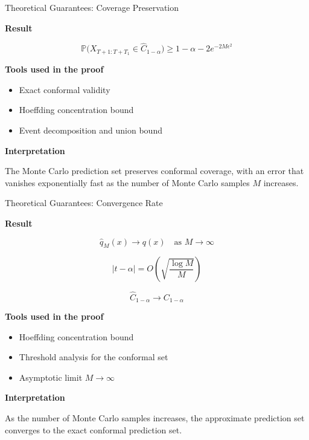 \documentclass{beamer}					%
\begin{document}
\begin{frame}{Theoretical Guarantees: Coverage Preservation}

\textbf{Result}

\[
\mathbb{P}\big(X_{T+1:T+T_1} \in \hat C_{1-\alpha}\big)
\ge
1-\alpha - 2e^{-2M\epsilon^2}
\]

\vspace{0.3cm}

\textbf{Tools used in the proof}

\begin{itemize}
\item Exact conformal validity
\item Hoeffding concentration bound
\item Event decomposition and union bound
\end{itemize}

\vspace{0.3cm}

\textbf{Interpretation}

The Monte Carlo prediction set preserves conformal coverage,
with an error that vanishes exponentially fast as the number
of Monte Carlo samples \(M\) increases.

\end{frame}

\begin{frame}{Theoretical Guarantees: Convergence Rate}

\textbf{Result}

\[
\hat{q}_M(x) \to q(x) \quad \text{as } M \to \infty
\]

\vspace{0.3cm}

\[
|t-\alpha|
=
O\!\left(\sqrt{\frac{\log M}{M}}\right)
\]

\vspace{0.3cm}

\[
\hat C_{1-\alpha} \rightarrow C_{1-\alpha}
\]

\vspace{0.3cm}

\textbf{Tools used in the proof}

\begin{itemize}
\item Hoeffding concentration bound
\item Threshold analysis for the conformal set
\item Asymptotic limit \(M \rightarrow \infty\)
\end{itemize}

\vspace{0.3cm}

\textbf{Interpretation}

As the number of Monte Carlo samples increases, the approximate
prediction set converges to the exact conformal prediction set.

\end{frame}
\end{document}
